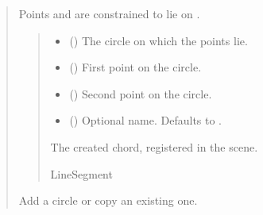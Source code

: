 \documentclass[letterpaper,10pt,english]{sphinxmanual}
\begin{document}
\begin{quote}
\begin{fulllineitems}
\begin{fulllineitems}
\sphinxAtStartPar
Points  and  are constrained to lie on .
\begin{quote}\begin{description}
\begin{itemize}
\item {} 
\sphinxAtStartPar
{} () \textendash{} The circle on which the points lie.

\item {} 
\sphinxAtStartPar
{} () \textendash{} First point on the circle.

\item {} 
\sphinxAtStartPar
{} () \textendash{} Second point on the circle.

\item {} 
\sphinxAtStartPar
{} (\sphinxstyleliteralemphasis{\sphinxupquote{ | }}) \textendash{} Optional name. Defaults to .

\end{itemize}

\sphinxAtStartPar
The created chord, registered in the scene.

\sphinxAtStartPar
LineSegment

\end{description}\end{quote}

\end{fulllineitems}


\begin{fulllineitems}
\label{\detokenize{pygeox:pygeox.add_objects.AddNamespace.circle}}
\pysigstartsignatures
\pysiglinewithargsret
{}
{\sphinxparamcomma {}\sphinxparamcomma {}\sphinxparamcomma {}}
{}
\pysigstopsignatures
\sphinxAtStartPar
Add a circle or copy an existing one.


\end{fulllineitems}
\end{fulllineitems}
\end{quote}
\end{document}
